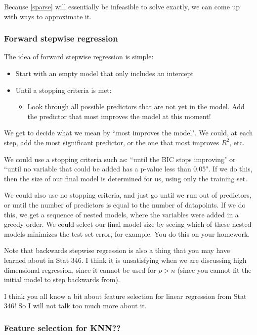 Because \eqref{sparse} will essentially be infeasible to solve exactly, we can come up with ways to approximate it. 

\subsubsection{Forward stepwise regression}

The idea of forward stepwise regression is simple:
\begin{itemize}
\item Start with an empty model that only includes an intercept
\item Until a stopping criteria is met:
\begin{itemize}
\item Look through all possible predictors that are not yet in the model. Add the predictor that most improves the model at this moment! 
\end{itemize}	
\end{itemize}

We get to decide what we mean by ``most improves the model". We could, at each step, add the most significant predictor, or the one that most improves $R^2$, etc.

We could use a stopping criteria such as: ``until the BIC stops improving" or ``until no variable that could be added has a p-value less than 0.05". If we do this, then the size of our final model is determined for us, using only the training set.

We could also use no stopping criteria, and just go until we run out of predictors, or until the number of predictors is equal to the number of datapoints. If we do this, we get a sequence of nested models, where the variables were added in a greedy order. We could select our final model size by seeing which of these nested models minimizes the test set error, for example. You do this on your homework.  

Note that backwards stepwise regression is also a thing that you may have learned about in Stat 346. I think it is unsatisfying when we are discussing high dimensional regression, since it cannot be used for $p > n$ (since you cannot fit the initial model to step backwards from). 

I think you all know a bit about feature selection for linear regression from Stat 346! So I will not talk too much more about it.

\subsubsection{Feature selection for KNN??}


